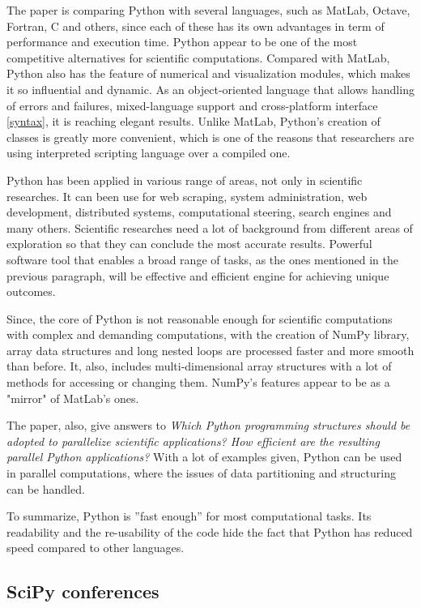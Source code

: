 The paper \cite{cai2005performance} is comparing Python with several languages, such as MatLab, Octave, Fortran, C and others, since each of these has its own advantages in term of performance and execution time. Python appear to be one of the most competitive alternatives for scientific computations. Compared with MatLab, Python also has the feature of numerical and visualization modules, which makes it so influential and dynamic. As an object-oriented language that allows handling of errors and failures, mixed-language support and cross-platform interface \ref{syntax}, it is reaching elegant results. Unlike MatLab, Python's creation of classes is greatly more convenient, which is one of the reasons that researchers are using interpreted scripting language over a compiled one.

Python has been applied in various range of areas, not only in scientific researches. It can been use for web scraping, system administration, web development, distributed systems, computational steering, search engines and many others. \cite{cai2005performance} Scientific researches need a lot of background from different areas of exploration so that they can conclude the most accurate results. Powerful software tool that enables a broad range of tasks, as the ones mentioned in the previous paragraph, will be effective and efficient engine for achieving unique outcomes. 

Since, the core of Python is not reasonable enough for scientific computations with complex and demanding computations, with the creation of NumPy library, array data structures and long nested loops are processed faster and more smooth than before. It, also, includes multi-dimensional array structures with a lot of methods for accessing or changing them. NumPy's features appear to be as a "mirror" of MatLab's ones. 

The paper, also, give answers to 
\textit{Which Python programming structures should be adopted to parallelize scientific applications? How efficient are the resulting parallel Python applications?} \cite{cai2005performance}
With a lot of examples given, Python can be used in parallel computations, where the issues of data partitioning and structuring can be handled. 

To summarize, Python is ”fast enough” for most computational tasks. Its readability and the re-usability of the code hide the fact that Python has reduced speed compared to other languages. 


\subsection{SciPy conferences \cite{johnSciPy}} 
\label{SciPy}


